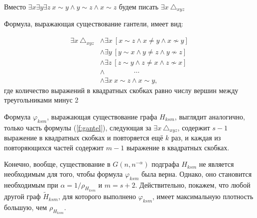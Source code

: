 Вместо 
$\exists x \exists y \exists z ~ x \sim y \wedge y \sim z \wedge x \sim z$
будем писать 
$\exists x~\triangle_{xyz}$

Формула, выражающая существование гантели, имеет вид:
\def\gantelRightPart {
&\wedge \exists x ~ 
    \left[ x \sim z \wedge x \neq y \wedge x \nsim y  \right] \\
&\wedge \exists y ~
    \left[ y \sim x \wedge y \neq z \wedge y \nsim z \right] \\
&\wedge \exists z ~
    \left[ z \sim y \wedge z \neq x \wedge z \nsim x  \right] \\
&\wedge ~ \qquad \qquad \cdots \\
&\wedge \exists x ~ 
    x \sim z \wedge x \sim y
}

\begin{equation}
\label{f:gantel}
\begin{split}
\exists x~\triangle_{xyz} \gantelRightPart,
\end{split}
\end{equation}
где количество выражений в квадратных скобках равно числу вершин между треугольниками минус 2

Формула $\varphi_{ksm} $, выражающая существование графа $H_{ksm}$, выглядит аналогично, только часть формулы (\ref{f:gantel}), следующая за 
$\exists x~\triangle_{xyz}$,
содержит $s-1$ выражение в квадратных скобках и повторяется ещё $k$ раз, и каждая из повторяющихся частей содержит $m-1 $ выражение в квадратных скобках.


Конечно, вообще, существование в $G(n, n^{-\alpha})$ подграфа $H_{ksm}$ не является необходимым для того, чтобы формула $\varphi_{ksm}$ была верна.
Однако, оно становится необходимым при $\alpha = 1/\rho_{H_{ksm}}$ и $m = s+2$. 
Действительно, покажем, что любой другой граф $\tilde H_{ksm}$, для которого выполнено $\varphi_{ksm}$, имеет максимальную плотность большую, чем $\rho_{H_{ksm}}$.

